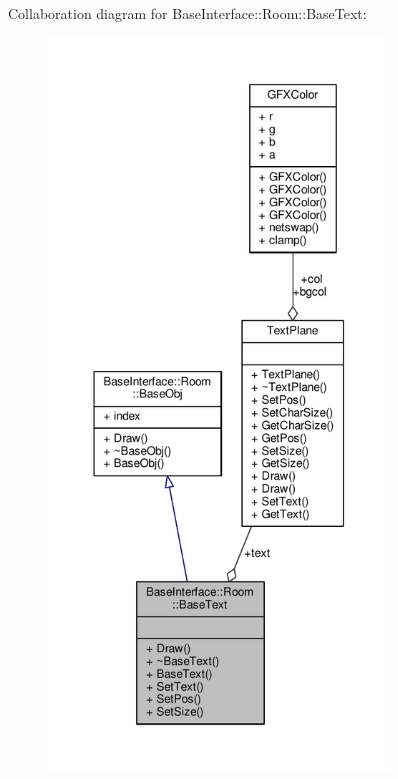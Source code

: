 Collaboration diagram for Base\+Interface\+:\+:Room\+:\+:Base\+Text\+:
\nopagebreak
\begin{figure}[H]
\begin{center}
\leavevmode
\includegraphics[height=550pt]{dd/daf/classBaseInterface_1_1Room_1_1BaseText__coll__graph}
\end{center}
\end{figure}
